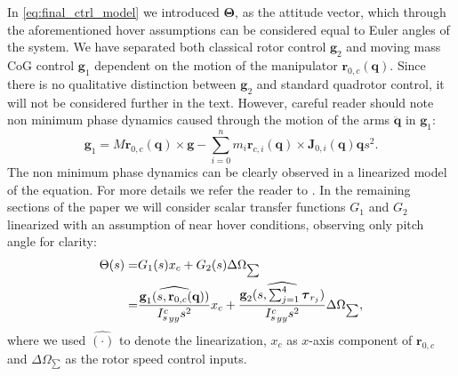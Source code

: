 In \eqref{eq:final_ctrl_model} we introduced ${\boldsymbol{\Theta}}$, as the attitude vector, which through the aforementioned hover assumptions can be considered equal to Euler angles of the system. We have separated both classical rotor control $\textbf{g}_2$ and moving mass CoG control $\textbf{g}_1$ dependent on the motion of the manipulator $\textbf{r}_{0,c}(\textbf{q})$. Since there is no qualitative distinction between $\textbf{g}_2$ and standard quadrotor control, it will not be considered further in the text. However, careful reader should note non minimum phase dynamics caused through the motion of the arms $\ddot{\textbf{q}}$ in $\textbf{g}_1$:
\begin{equation}
\textbf{g}_1=M {\textbf{r}_{0,c}}(\textbf{q}) \times \textbf{g}-\sum_{i=0}^n m_i {\textbf{r}_{c,i}}\left ( \textbf{q}\right) \times \textbf{J}_{0,i}(\textbf{q}) {\textbf{q}}s^2.
\end{equation}
The non minimum phase dynamics can be clearly observed in a linearized model of the equation. For more details we refer the reader to \cite{Haus2017}. In the remaining sections of the paper we will consider scalar transfer functions $G_1$ and $G_2$ linearized with an assumption of near hover conditions, observing only pitch angle for clarity:
\begin{align}
\Theta(s) = & G_1(s)x_c+G_2(s)\Delta \Omega_{\sum}\\ \nonumber
 =&\frac{\widehat{\textbf{g}_1(s,\textbf{r}_{0,c}(\textbf{q}))}}{{I_s^c}_{yy}s^2}x_c+\frac{\widehat{\textbf{g}_2(s,\sum_{j=1}^4 \boldsymbol{\tau}_{r_j})}}{{I_s^c}_{yy}s^2}\Delta \Omega_{\sum},
\end{align}
where we used $\widehat{(\cdot)}$ to denote the linearization, $x_c$ as $x$-axis component of $\textbf{r}_{0,c}$ and $\Delta \Omega_{\sum}$ as the rotor speed control inputs.
